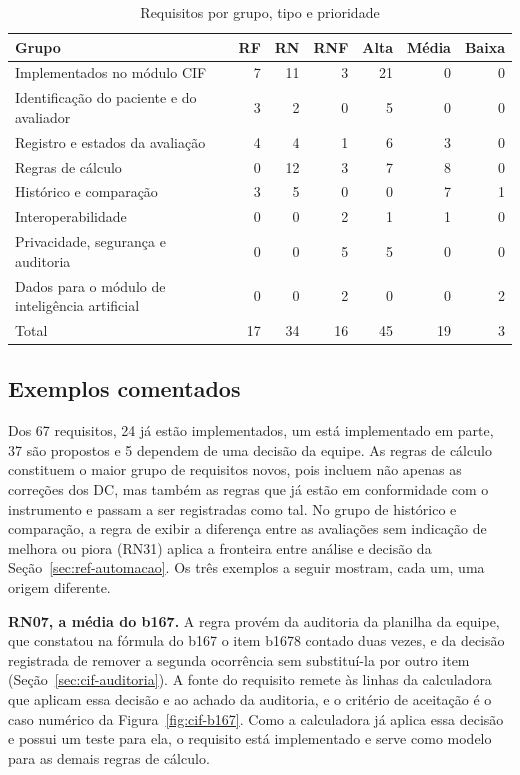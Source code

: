 \begin{table}[htb]
	\centering
	\caption{Requisitos por grupo, tipo e prioridade}
	\label{tab:esp-resumo}
	\footnotesize
	\begin{tabularx}{\textwidth}{@{}Xrrrrrr@{}}
		\toprule
		Grupo & RF & RN & RNF & Alta & Média & Baixa \\
		\midrule
		Implementados no módulo CIF & 7 & 11 & 3 & 21 & 0 & 0 \\
		Identificação do paciente e do avaliador & 3 & 2 & 0 & 5 & 0 & 0 \\
		Registro e estados da avaliação & 4 & 4 & 1 & 6 & 3 & 0 \\
		Regras de cálculo & 0 & 12 & 3 & 7 & 8 & 0 \\
		Histórico e comparação & 3 & 5 & 0 & 0 & 7 & 1 \\
		Interoperabilidade & 0 & 0 & 2 & 1 & 1 & 0 \\
		Privacidade, segurança e auditoria & 0 & 0 & 5 & 5 & 0 & 0 \\
		Dados para o módulo de inteligência artificial & 0 & 0 & 2 & 0 & 0 & 2 \\
		\midrule
		Total & 17 & 34 & 16 & 45 & 19 & 3 \\
		\bottomrule
	\end{tabularx}
\end{table}

\subsection{Exemplos comentados}
\label{sec:esp-exemplos}

Dos 67 requisitos, 24 já estão implementados, um está implementado em parte, 37 são propostos e 5 dependem de uma
decisão da equipe. As regras de cálculo constituem o maior grupo de requisitos novos, pois incluem não apenas as
correções dos DC, mas também as regras que já estão em conformidade com o instrumento e passam a ser registradas como
tal. No grupo de histórico e comparação, a regra de exibir a diferença entre as avaliações sem indicação de melhora ou
piora (RN31) aplica a fronteira entre análise e decisão da Seção~\ref{sec:ref-automacao}. Os três exemplos a seguir
mostram, cada um, uma origem diferente.

\textbf{RN07, a média do b167.} A regra provém da auditoria da planilha da equipe, que constatou na fórmula do b167 o
item b1678 contado duas vezes, e da decisão registrada de remover a segunda ocorrência sem substituí-la por outro
item (Seção~\ref{sec:cif-auditoria}). A fonte do requisito remete às linhas da calculadora que aplicam essa decisão e
ao achado da auditoria, e o critério de aceitação é o caso numérico da Figura~\ref{fig:cif-b167}. Como a calculadora
já aplica essa decisão e possui um teste para ela, o requisito está implementado e serve como modelo para as demais
regras de cálculo.

